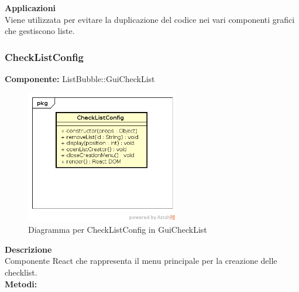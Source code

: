 \textbf{Applicazioni}\\
Viene utilizzata per evitare la duplicazione del codice nei vari componenti grafici che gestiscono liste. 


\clearpage

\subsubsection{CheckListConfig}
\textbf{Componente:}  ListBubble::GuiCheckList\\
   \FloatBarrier
   \begin{figure}[ht]
   \centering
   \includegraphics[width=0.6\textwidth]{img/single-CheckListConfig.png}
   \caption{{Diagramma per CheckListConfig in GuiCheckList}}
\end{figure}
\FloatBarrier
\textbf{Descrizione}\\
Componente React che rappresenta il menu principale per la creazione delle checklist. \\
\textbf{Metodi:} 
